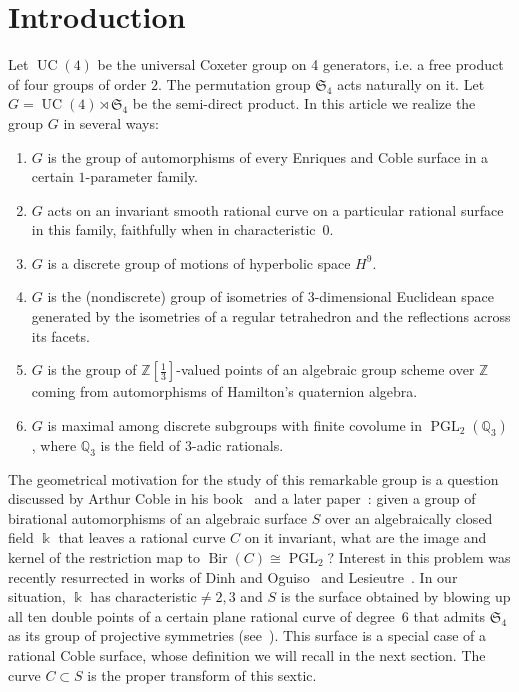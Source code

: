 \documentclass[11pt]{article}
\theoremstyle{definition}
\numberwithin{equation}{section}
\numberwithin{figure}{section}
\numberwithin{table}{section}
\newcommand*\sset{\subset}
\newcommand{\bbQ}{{\mathbb{Q}}}
\newcommand{\bbZ}{{\mathbb{Z}}}
\DeclareMathOperator{\PGL}{PGL}
\DeclareMathOperator{\UC}{UC}
\DeclareMathOperator{\Bir}{Bir}
\newcommand{\frakS}{\mathfrak{S}}
\begin{document}
\section{Introduction}

Let $\UC(4)$ be the universal Coxeter group on 4 generators, i.e. a free product of four groups of order $2$. The permutation group $\frakS_4$ acts naturally on it. Let $G = \UC(4)\rtimes \frakS_4$ be the semi-direct product. In this article we realize the group $G$ in several ways:
\begin{enumerate}
\item \label{list1.1}$G$ is the group of automorphisms of every Enriques and Coble surface in a certain $1$-parameter family.
\item \label{list1.2}$G$ acts on an invariant smooth rational curve on a particular rational surface in this family, faithfully when in characteristic~$0$.
\item \label{list1.3}$G$ is a discrete group of motions of hyperbolic space $H^9$.
\item \label{list1.4}$G$ is the (nondiscrete) group of isometries of $3$-dimensional Euclidean space generated by the isometries of a regular tetrahedron and the reflections across its facets.
\item \label{list1.5}$G$ is the group of $\bbZ[\frac13]$-valued points of an algebraic group scheme over $\bbZ$ coming from automorphisms of Hamilton's quaternion algebra.
\item \label{list1.6}$G$ is maximal among discrete subgroups with finite covolume in $\PGL_2({\bbQ}_3)$, where ${\bbQ}_3$ is the field of $3$-adic rationals.
\end{enumerate}

The geometrical motivation for the study of this remarkable group is a question discussed by Arthur Coble in his book~\cite[p.~226--227]{Coble} and a later paper~\cite{Coble2}: given a group of birational automorphisms of an algebraic surface $S$ over an algebraically closed field $\Bbbk$ that leaves a rational curve $C$ on it invariant, what are the image and kernel of the restriction map to $\Bir(C)\cong \PGL_2$? Interest in this problem was recently resurrected in works of Dinh and Oguiso~\cite{Oguiso} and Lesieutre~\cite{Lesieutre}. In our situation, $\Bbbk$ has characteristic${}\neq2,3$ and $S$ is the surface obtained by blowing up all ten double points of a certain plane rational curve of degree~6 that admits $\frakS_4$ as its group of projective symmetries (see~\cite[Section~5.4]{DolgachevSalem}). This surface is a special case of a rational Coble surface, whose definition we will recall in the next section. The curve $C\sset S$ is the proper transform of this sextic.
\end{document}
